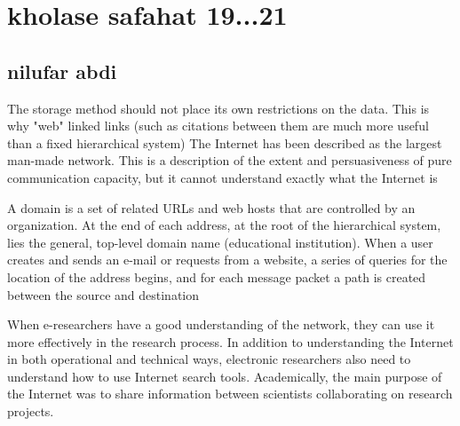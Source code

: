 \documentclass [12pt]{beamer}
\begin{document}
\section*{kholase safahat 19...21}
\subsection*{nilufar abdi  }	
\begin{frame}
\justifying	
The storage method should not place its own restrictions on the data.  This is why "web" linked links (such as citations between them are much more useful than a fixed hierarchical system)
The Internet has been described as the largest man-made network.  This is a description of the extent and persuasiveness of pure communication capacity, but it cannot understand exactly what the Internet is
\end{frame}

\begin{frame}
\justifying	
A domain is a set of related URLs and web hosts that are controlled by an organization.  At the end of each address, at the root of the hierarchical system, lies the general, top-level domain name (educational institution).
When a user creates and sends an e-mail or requests from a website, a series of queries for the location of the address begins, and for each message packet a path is created between the source and destination
\end{frame}

\begin{frame}
\justifying	
When e-researchers have a good understanding of the network, they can use it more effectively in the research process.  In addition to understanding the Internet in both operational and technical ways, electronic researchers also need to understand how to use Internet search tools.  Academically, the main purpose of the Internet was to share information between scientists collaborating on research projects.
\end{frame}
\end{document}
